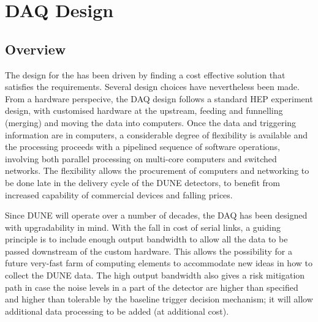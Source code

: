 
\section{DAQ Design}
\label{sec:fdsp-daq-design}



\subsection{Overview}
\label{sec:fdsp-daq-ltr}



The design for the  has been driven by finding a cost
effective solution that satisfies the requirements. Several design
choices have nevertheless been made. 
From a hardware perspecive, the DAQ design follows a standard HEP
experiment design, with customised hardware at the upstream, feeding
and funnelling (merging) and moving the data into computers. 
Once the data and triggering information are in computers, a
considerable degree of flexibility is available and the processing
proceeds with a pipelined sequence of software operations, involving
both parallel processing on multi-core computers and switched
networks. The flexibility allows the procurement of computers and
networking to be done late in the delivery cycle of the DUNE
detectors, to benefit from increased capability of commercial devices
and falling prices.

Since DUNE will operate over a number of decades, the DAQ has been
designed with upgradability in mind.  With the fall in cost of serial
links, a guiding principle is to include enough output bandwidth to
allow all the data to be passed downstream of the custom hardware.
This allows the possibility for a future very-fast farm of computing
elements to accommodate new ideas in how to collect the DUNE data.  The
high output bandwidth also gives a risk mitigation path in case the
noise levels in a part of the detector are higher than specified and
higher than tolerable by the baseline trigger decision mechanism; it
will allow additional data processing to be added (at additional cost).

